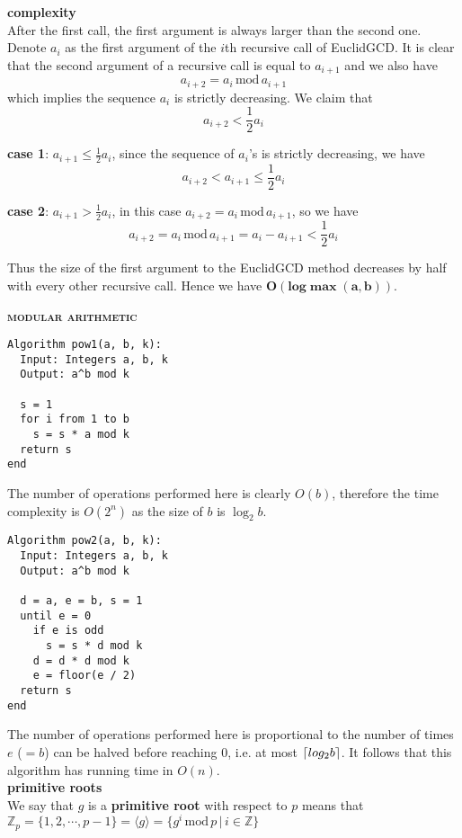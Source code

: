 \documentclass[a4paper]{article}
\DeclarePairedDelimiter\ceil{\lceil}{\rceil}
\begin{document}
\begin{multicols}{2}
\begin{framed}
\noindent
\textbf{complexity}\\
After the first call, the first argument is always larger than the second one. Denote $a_i$ as the first argument of the $i$th recursive call of EuclidGCD. It is clear that the second argument of a recursive call is equal to $a_{i + 1}$ and we also have $$a_{i+2} = a_i \, \text{mod} \, a_{i+1}$$ which implies the sequence $a_i$ is strictly decreasing. We claim that $$a_{i+2} < \frac{1}{2}a_i$$

\noindent
\textbf{case 1}: $a_{i+1} \leq \frac{1}{2}a_i$, since the sequence of $a_i$'s is strictly decreasing, we have $$a_{i+2} < a_{i+1} \leq \frac{1}{2} a_i$$

\noindent
\textbf{case 2}: $a_{i+1} > \frac{1}{2}a_i$, in this case $a_{i + 2} = a_i \, \text{mod} \, a_{i+1}$, so we have $$a_{i+2} = a_i \, \text{mod} \, a_{i+1} = a_i - a_{i + 1} < \frac{1}{2}a_i$$

\noindent
Thus the size of the first argument to the EuclidGCD method decreases by half with every other recursive call. Hence we have $\bm{O(log \max(a, b))}$.
\end{framed}

\begin{framed}
	\begin{center}
		\textbf{\textsc{modular arithmetic}}
	\end{center}
\begin{lstlisting}
Algorithm pow1(a, b, k):
  Input: Integers a, b, k
  Output: a^b mod k
		
  s = 1
  for i from 1 to b
    s = s * a mod k
  return s
end
\end{lstlisting}
\noindent
The number of operations performed here is clearly $O(b)$, therefore the time complexity is $O(2^n)$ as the size of $b$ is $\log_2 b$.\\
\begin{lstlisting}
Algorithm pow2(a, b, k):
  Input: Integers a, b, k
  Output: a^b mod k
		
  d = a, e = b, s = 1
  until e = 0
    if e is odd
      s = s * d mod k
    d = d * d mod k
    e = floor(e / 2)
  return s
end
\end{lstlisting}
\noindent
The number of operations performed here is proportional to the number of times $e$ ($=b$) can be halved before reaching 0, i.e. at most $\ceil{log_2b}$. It follows that this algorithm has running time in $O(n)$.\\

\noindent
\textbf{primitive roots}\\
We say that $g$ is a \textbf{primitive root} with respect to $p$ means that $\mathbb{Z}_p = \{1, 2, \cdots, p - 1\}= \langle g \rangle = \{g^i \, \text{mod} \, p \, \vert \, i \in \mathbb{Z}\}$\\


\end{framed}
\end{multicols}
\end{document}
